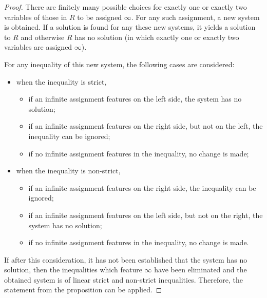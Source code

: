 \documentclass{article}
\begin{document}
\begin{proof}
  There are finitely many possible choices for exactly one or exactly two variables of those in $R$ to be assigned $\infty$. For any such assignment, a new system is obtained. If a solution is found for any these new systems, it yields a solution to $R$ and otherwise $R$ has no solution (in which exactly one or exactly two variables are assigned $\infty$).

  For any inequality of this new system, the following cases are considered:
  \begin{itemize}
  \item when the inequality is strict,
    \begin{itemize}
    \item if an infinite assignment features on the left side, the system has no solution;
    \item if an infinite assignment features on the right side, but not on the left, the inequality can be ignored;
    \item if no infinite assignment features in the inequality, no change is made;
    \end{itemize}
  \item when the inequality is non-strict,
    \begin{itemize}
    \item if an infinite assignment features on the right side, the inequality can be ignored;
    \item if an infinite assignment features on the left side, but not on the right, the system has no solution;
    \item if no infinite assignment features in the inequality, no change is made.
    \end{itemize}
  \end{itemize}
  If after this consideration, it has not been established that the system has no solution, then the inequalities which feature $\infty$ have been eliminated and the obtained system is of linear strict and non-strict inequalities. Therefore, the statement from the proposition can be applied.
\end{proof}
\end{document}

